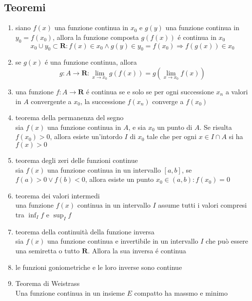 \documentclass{exam}
\begin{document}
  \subsection{Teoremi}
    \begin{enumerate}
      \item
        siano $f(x)$ una funzione continua in $x_{0}$ e
        $g(y)$ una funzione continua in $y_{0}=f(x_{0})$, allora
        la funzione composta $g(f(x))$ \'e continua in $x_{0}$
        \begin{equation}
          x_{0}\cup y_{0}\subset \mathbf{R}:f(x) \in x_{0} \land g(y) 
          \in y_{0}=f(x_{0}) \Rightarrow f(g(x))\in x_{0}
        \end{equation}
      \item
        se $g(x)$ \'e una funzione continua, allora
        \begin{equation}
          g:A\rightarrow \mathbf{R}:\lim_{x\to x_{0}}g(f(x))=g(\lim_{x\to x_{0}}f(x))
        \end{equation}
      \item
        una funzione $f:A\rightarrow \mathbf{R}$ \'e continua se e solo se per ogni successione $x_{n}$ a valori in $A$ convergente a $x_{0}$, la successione $f(x_{n})$ converge a $f(x_{0})$
      \item{teorema della permanenza del segno}\\
        sia $f(x)$ una funzione continua in $A$, e sia $x_{0}$ un punto di $A$. Se risulta $f(x_{0})>0$, allora esiste un'intordo $I$ di $x_{0}$ tale che per ogni $x\in I\cap A$ si ha $f(x)>0$
      \item{teorema degli zeri delle funzioni continue}\\
        sia $f(x)$ una funzione continua in un intervallo $[a,b]$, se $f(a)>0 \lor f(b)<0$, allora esiste un punto $x_{0}\in (a,b):f(x_{0})=0$
      \item{teorema dei valori intermedi}\\
        una funzione $f(x)$ continua in un intervallo $I$ assume tutti i valori compresi tra $\inf_{I}f$ e $\sup_{I}f$
      \item{teorema della continuità della funzione inversa}\\
        sia $f(x)$ una funzione continua e invertibile in un intervallo $I$ che può essere una semiretta o tutto $\mathbf{R}$. Allora la sua inversa \'e continua
      \item le funzioni goniometriche e le loro inverse sono continue
      \item{Teorema di Weistrass}\\
        Una funzione continua in un insieme $E$ compatto ha massmo e minimo
    \end{enumerate}
  \newpage
\end{document}
